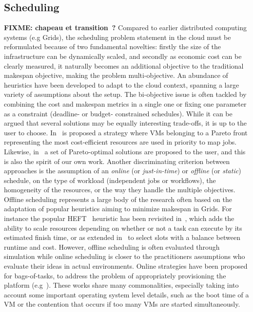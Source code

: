 \subsection{Scheduling}
\textbf{FIXME: chapeau et transition~?}
Compared to earlier distributed computing systems (e.g Grids), the scheduling
problem statement in the cloud must be reformulated because of two fundamental
novelties: firstly the size of the infrastructure can be dynamically scaled, and
secondly as economic cost can be clearly measured, it naturally becomes an
additional objective to the traditional makespan objective, making the problem
multi-objective. An abundance of heuristics have been developed to adapt to the
cloud context, spanning a large variety of assumptions about the setup. The
bi-objective issue is often tackled by combining the cost and makespan metrics
in a single one or fixing one parameter as a constraint (deadline- or budget-
constrained schedules). While it can be argued that several solutions may be
equally interesting trade-offs, it is up to the user to choose. In~\cite{Su13}
is proposed a strategy where VMs belonging to a Pareto front representing the
most cost-efficient resources are used in priority to map jobs. Likewise,
in~\cite{Durillo14} a set of Pareto-optimal solutions are proposed to the user,
and this is also the spirit of our own work. Another discriminating criterion
between approaches is the assumption of an \emph{online} (or
\emph{just-in-time}) or \emph{offline} (or \emph{static}) schedule, on the type
of workload (independent jobs or workflows), the homogeneity of the resources,
or the way they handle the multiple objectives. Offline scheduling represents a
large body of the research often based on the adaptation of popular heuristics
aiming to minimize makespan in Grids. For instance the popular
HEFT~\cite{Zhao2003} heuristic has been revisited in~\cite{LinL11}, which adds
the ability to scale resources depending on whether or not a task can execute by
its estimated finish time, or as extended in~\cite{Li11cost-conscious} to select
slots with a balance between runtime and cost. However, offline scheduling is
often evaluated through simulation while online scheduling is closer to the
practitioners assumptions who evaluate their ideas in actual environments.
Online strategies have been proposed for bags-of-tasks, to address the problem
of appropriately provisioning the platform
(e.g~\cite{MarshallKF10,GenaudG11,DuongLG11,VillegasASI12}). These works share
many commonalities, especially taking into account some important operating
system level details, such as the boot time of a VM or the contention that
occurs if too many VMs are started simultaneously. 
